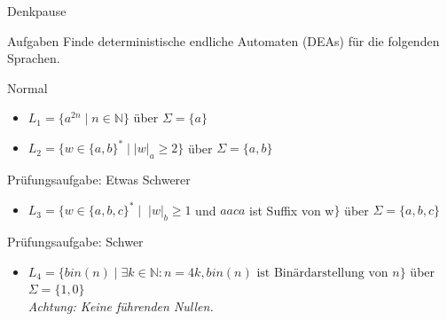 \documentclass[10pt]{beamer}
\begin{document}
{
\begin{frame}{Denkpause}
\footnotesize
    \begin{alertblock}{Aufgaben}
    Finde deterministische endliche Automaten (DEAs) für die folgenden Sprachen.
    \end{alertblock}
    \begin{block}{Normal}
    \begin{itemize}
        \item $L_1 = \{a^{2n} \mid n \in \mathbb{N}\}$ über $\Sigma=\{a\}$
        \item $L_2 = \{w\in \{a,b\}^* \mid |w|_a \geq 2\}$ über $\Sigma=\{a,b\}$
    \end{itemize}
    \end{block}
    \begin{block}{Prüfungsaufgabe: Etwas Schwerer}
    \begin{itemize}
        \item $L_3 = \{w \in \{a, b, c\}^* \mid \; |w|_b \geq 1$ und $aaca$ ist Suffix von w$\}$ über $\Sigma=\{a,b,c\}$
    \end{itemize}
    \end{block}
    \begin{block}{Prüfungsaufgabe: Schwer}
    \begin{itemize}
        \item $L_4 = \{bin(n)\mid \exists k \in \mathbb{N}: n=4k, bin(n)\text{ ist Binärdarstellung von }n\}$ über $\Sigma=\{1,0\}$\\
        \emph{Achtung: Keine führenden Nullen.}
    \end{itemize}
    \end{block}
\end{frame}
}
\end{document}
